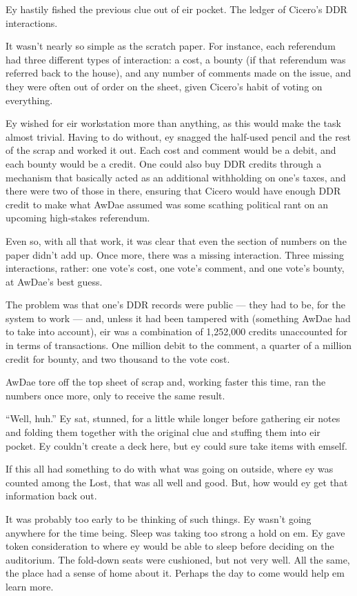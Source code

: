 Ey hastily fished the previous clue out of eir pocket. The ledger of Cicero's DDR interactions.

It wasn't nearly so simple as the scratch paper. For instance, each referendum had three different types of interaction: a cost, a bounty (if that referendum was referred back to the house), and any number of comments made on the issue, and they were often out of order on the sheet, given Cicero's habit of voting on everything.

Ey wished for eir workstation more than anything, as this would make the task almost trivial. Having to do without, ey snagged the half-used pencil and the rest of the scrap and worked it out. Each cost and comment would be a debit, and each bounty would be a credit. One could also buy DDR credits through a mechanism that basically acted as an additional withholding on one's taxes, and there were two of those in there, ensuring that Cicero would have enough DDR credit to make what AwDae assumed was some scathing political rant on an upcoming high-stakes referendum.

Even so, with all that work, it was clear that even the section of numbers on the paper didn't add up. Once more, there was a missing interaction. Three missing interactions, rather: one vote's cost, one vote's comment, and one vote's bounty, at AwDae's best guess.

The problem was that one's DDR records were public --- they had to be, for the system to work --- and, unless it had been tampered with (something AwDae had to take into account), eir was a combination of 1,252,000 credits unaccounted for in terms of transactions. One million debit to the comment, a quarter of a million credit for bounty, and two thousand to the vote cost.

AwDae tore off the top sheet of scrap and, working faster this time, ran the numbers once more, only to receive the same result.

``Well, huh.'' Ey sat, stunned, for a little while longer before gathering eir notes and folding them together with the original clue and stuffing them into eir pocket. Ey couldn't create a deck here, but ey could sure take items with emself.

If this all had something to do with what was going on outside, where ey was counted among the Lost, that was all well and good. But, how would ey get that information back out.

It was probably too early to be thinking of such things. Ey wasn't going anywhere for the time being. Sleep was taking too strong a hold on em. Ey gave token consideration to where ey would be able to sleep before deciding on the auditorium. The fold-down seats were cushioned, but not very well. All the same, the place had a sense of home about it. Perhaps the day to come would help em learn more.

